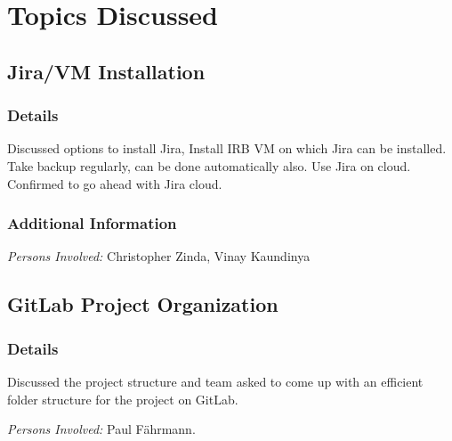 \documentclass{meetingmins}
\begin{document}
\maketitle

\section{Topics Discussed}

\subsection{Jira/VM Installation}
        \subsubsection{Details}
        \begin{hiddensubitems}
            \item
                Discussed options to install Jira,
            \subitem    
                Install IRB VM on which Jira can be installed. Take backup regularly, can be done automatically also.
            \subitem
                Use Jira on cloud. Confirmed to go ahead with Jira cloud.
        \end{hiddensubitems}
        \subsubsection{Additional Information}
        \begin{hiddensubitems}
            \item
                \textit{Persons Involved: } Christopher Zinda, Vinay Kaundinya
        \end{hiddensubitems}

\subsection{GitLab Project Organization}
        \subsubsection{Details}
        \begin{hiddensubitems}
            \item
                Discussed the project structure and team asked to come up with an efficient folder structure for the project on GitLab.
        \end{hiddensubitems}
        \begin{hiddensubitems}
            \item
                \textit{Persons Involved: } Paul Fährmann.
        \end{hiddensubitems}
\end{document}
